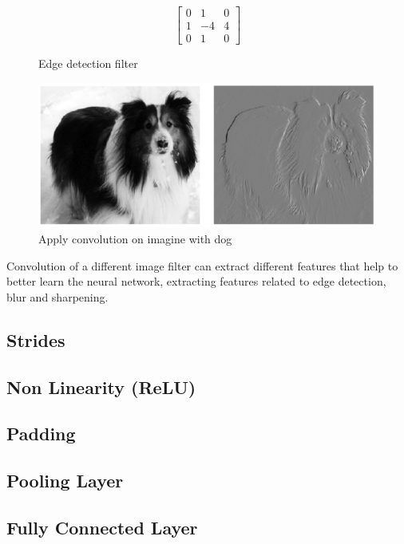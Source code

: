  \begin{figure}[htbp]
  $$\begin{bmatrix}
    0  & 1 & 0 \\
    1  & -4 & 4  \\
    0  & 1 & 0 
\end{bmatrix}$$
  \caption{Edge detection filter}
  \label{fig:edge-detection-filter}
\end{figure}
 \begin{figure}[htbp]
  \centerline{\includegraphics[scale=0.45]{fig/con-dog.PNG}}  
  \caption{Apply convolution on imagine with dog \cite{Mallat:2008:WTS:1525499}}
  \label{fig:exemple-dog-convolution}
\end{figure}
Convolution of a different image filter can extract different features that help to better learn the neural network,
 extracting features related to edge detection, blur and sharpening.
\subsection{Strides}
\subsection{Non Linearity (ReLU)}
\subsection{Padding}
\subsection{Pooling Layer}
\subsection{Fully Connected Layer}


